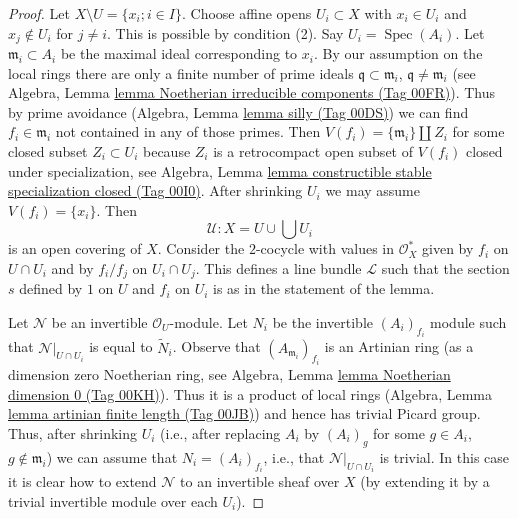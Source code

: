 \documentclass{amsart}
\theoremstyle{plain}
\theoremstyle{definition}
\theoremstyle{remark}
\numberwithin{equation}{subsection}
\def\Spec{\mathop{\mathrm{Spec}}}
\begin{document}
\begin{proof}
Let $X \setminus U = \{x_i; i \in I\}$.
Choose affine opens $U_i \subset X$ with $x_i \in U_i$ and
$x_j \not \in U_i$ for $j \not = i$. This is possible by condition (2).
Say $U_i = \Spec(A_i)$. Let $\mathfrak m_i \subset A_i$ be the maximal
ideal corresponding to $x_i$. By our assumption on the local rings
there are only a finite number of prime ideals
$\mathfrak q \subset \mathfrak m_i$,
$\mathfrak q \not = \mathfrak m_i$ (see
Algebra, Lemma \href{https://stacks.math.columbia.edu/tag/00FR}{lemma Noetherian irreducible components (Tag 00FR)}).
Thus by prime avoidance (Algebra, Lemma
\href{https://stacks.math.columbia.edu/tag/00DS}{lemma silly (Tag 00DS)}) we can find $f_i \in \mathfrak m_i$
not contained in any of those primes. Then
$V(f_i) = \{\mathfrak m_i\} \amalg Z_i$ for some closed subset
$Z_i \subset U_i$ because $Z_i$ is a retrocompact open subset of
$V(f_i)$ closed under specialization, see
Algebra, Lemma \href{https://stacks.math.columbia.edu/tag/00I0}{lemma constructible stable specialization closed (Tag 00I0)}.
After shrinking $U_i$ we may assume $V(f_i) = \{x_i\}$. Then
$$
\mathcal{U} : X = U \cup \bigcup U_i
$$
is an open covering of $X$. Consider the $2$-cocycle with values
in $\mathcal{O}_X^*$ given by $f_i$ on $U \cap U_i$ and by
$f_i/f_j$ on $U_i \cap U_j$. This defines a line bundle
$\mathcal{L}$ such that the section $s$ defined by $1$ on $U$
and $f_i$ on $U_i$ is as in the statement of the lemma.

\medskip\noindent
Let $\mathcal{N}$ be an invertible $\mathcal{O}_U$-module.
Let $N_i$ be the invertible $(A_i)_{f_i}$ module such that
$\mathcal{N}|_{U \cap U_i}$ is equal to $\tilde N_i$.
Observe that $(A_{\mathfrak m_i})_{f_i}$ is an Artinian ring
(as a dimension zero Noetherian ring, see
Algebra, Lemma \href{https://stacks.math.columbia.edu/tag/00KH}{lemma Noetherian dimension 0 (Tag 00KH)}).
Thus it is a product of local rings
(Algebra, Lemma \href{https://stacks.math.columbia.edu/tag/00JB}{lemma artinian finite length (Tag 00JB)}) and
hence has trivial Picard group. Thus, after shrinking $U_i$
(i.e., after replacing $A_i$ by $(A_i)_g$ for some $g \in A_i$,
$g \not \in \mathfrak m_i$)
we can assume that $N_i = (A_i)_{f_i}$, i.e., that
$\mathcal{N}|_{U \cap U_i}$ is trivial. In this case it is
clear how to extend $\mathcal{N}$ to an invertible sheaf over $X$
(by extending it by a trivial invertible module over each $U_i$).
\end{proof}
\end{document}
